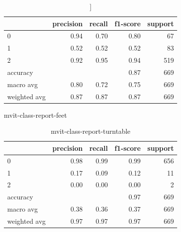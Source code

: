 \begin{table}[h!]
    \begin{tabular}{|l|r|r|r|r|}
                \hline & precision &   recall & f1-score &  support \\ \hline
                0 &      0.94 &      0.70 &      0.80 &        67 \\
                1 &      0.52 &      0.52 &      0.52 &        83 \\
                2 &      0.92 &      0.95 &      0.94 &       519 \\
         accuracy &           &           &      0.87 &       669 \\ \hline
        macro avg &      0.80 &      0.72 &      0.75 &       669 \\
     weighted avg &      0.87 &      0.87 &      0.87 &       669 \\
         \hline
    \end{tabular}
    \caption[[Feet class report]]{mvit-class-report-feet}
    \label{tbl:mvit-class-report-feet}
\end{table}

\begin{table}[h!]
    \begin{tabular}{|l|r|r|r|r|}
                \hline & precision &   recall & f1-score &  support \\ \hline
                0 &      0.98 &     0.99 &     0.99 &      656 \\
                1 &      0.17 &     0.09 &     0.12 &       11 \\
                2 &      0.00 &     0.00 &     0.00 &        2 \\ \hline
         accuracy &           &          &     0.97 &      669 \\
        macro avg &      0.38 &     0.36 &     0.37 &      669 \\
     weighted avg &      0.97 &     0.97 &     0.97 &      669 \\
         \hline
    \end{tabular}
    \caption[Turntable class report]{mvit-class-report-turntable}
    \label{tbl:mvit-class-report-turntable}
\end{table}

